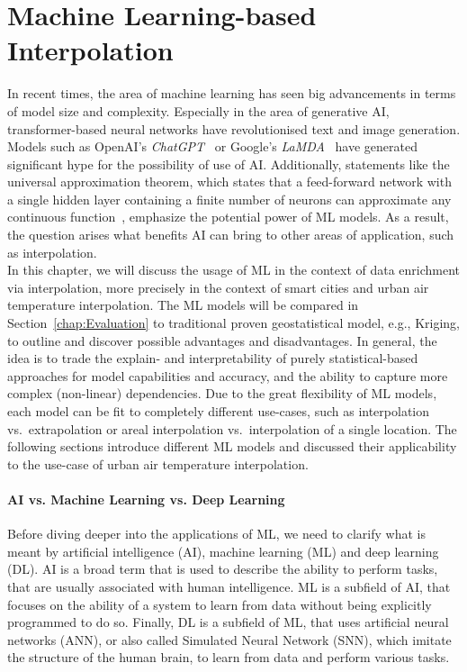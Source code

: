 \chapter{Machine Learning-based Interpolation}
\label{chap:Machine Learning based Interpolation}

In recent times, the area of machine learning has seen big advancements in terms of model size and complexity. Especially in the area of generative AI, transformer-based neural networks have revolutionised text and image generation. Models such as OpenAI's \textit{ChatGPT}~\cite{openai2023gpt4} or Google's \textit{LaMDA}~\cite{thoppilan2022lamda} have generated significant hype for the possibility of use of AI\@. Additionally, statements like the universal approximation theorem, which states that a feed-forward network with a single hidden layer containing a finite number of neurons can approximate any continuous function~\cite{hornik1989multilayer}, emphasize the potential power of ML models. As a result, the question arises what benefits AI can bring to other areas of application, such as interpolation.\\
In this chapter, we will discuss the usage of ML in the context of data enrichment via interpolation, more precisely in the context of smart cities and urban air temperature interpolation. The ML models will be compared in Section~\ref{chap:Evaluation} to traditional proven geostatistical model, e.g., Kriging, to outline and discover possible advantages and disadvantages. In general, the idea is to trade the explain- and interpretability of purely statistical-based approaches for model capabilities and accuracy, and the ability to capture more complex (non-linear) dependencies.
Due to the great flexibility of ML models, each model can be fit to completely different use-cases, such as interpolation vs.\ extrapolation or areal interpolation vs.\ interpolation of a single location. The following sections introduce different ML models and discussed their applicability to the use-case of urban air temperature interpolation.

\subsubsection{AI vs. Machine Learning vs. Deep Learning}

Before diving deeper into the applications of ML, we need to clarify what is meant by artificial intelligence (AI), machine learning (ML) and deep learning (DL). AI is a broad term that is used to describe the ability to perform tasks, that are usually associated with human intelligence. ML is a subfield of AI, that focuses on the ability of a system to learn from data without being explicitly programmed to do so. Finally, DL is a subfield of ML, that uses artificial neural networks (ANN), or also called Simulated Neural Network (SNN), which imitate the structure of the human brain, to learn from data and perform various tasks.

